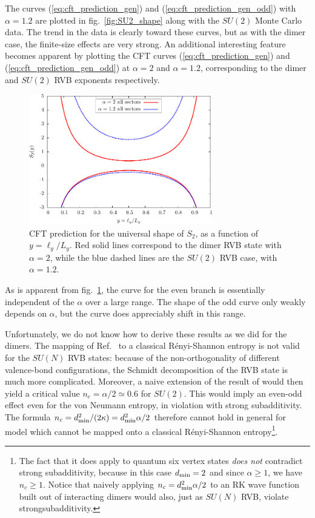 \documentclass[11pt]{iopart}
\begin{document}
The curves (\ref{eq:cft_prediction_gen}) and (\ref{eq:cft_prediction_gen_odd}) 
 with $\alpha=1.2$ are plotted in fig.~\ref{fig:SU2_shape} along with the $SU(2)$ Monte Carlo data.  The trend in the data is clearly toward these curves, but as with the dimer case, the finite-size effects are very strong. 
An additional interesting feature becomes apparent by plotting the CFT curves
(\ref{eq:cft_prediction_gen}) and (\ref{eq:cft_prediction_gen_odd}) at $\alpha=2$ and $\alpha=1.2$, corresponding to the dimer and $SU(2)$ RVB exponents respectively.
\begin{figure}[ht]
 \begin{center}
  \includegraphics[width=8cm]{./figures/SUN_CFT.pdf}
 \end{center}
\caption{CFT prediction for the universal shape of $S_2$, as a function of $y=\ell_y/L_y$. Red solid lines correspond to the dimer RVB state with $\alpha=2$, while the blue dashed lines are the $SU(2)$ RVB case, with $\alpha= 1.2$.}
\label{fig:SUN_CFT}
\end{figure}
As is apparent from fig.~\ref{fig:SUN_CFT}, the curve for the even branch is essentially independent of the $\alpha$ over a large range. The shape of the odd curve only weakly depends on $\alpha$, but the curve does appreciably shift in this range.

Unfortunately, we do not know how to derive these results as we did for the dimers. The mapping of Ref.~\cite{Shannonee} to a classical R\'enyi-Shannon entropy is not valid for the $SU(N)$ RVB states: because of the non-orthogonality of different valence-bond configurations, the Schmidt decomposition of the RVB state is much more complicated.  Moreover, a naive extension of the result of \cite{Stephan2011} would then yield a critical value $ n_c=\alpha/2\simeq 0.6$  for $SU(2)$. This would imply an even-odd effect even for the von Neumann entropy, in violation with strong subadditivity\cite{Strongsubadditivity}. The formula $n_c=d_{\rm min }^2/(2\kappa)=d_{\rm min}^2\alpha/2$ therefore cannot hold in general for model which cannot be mapped onto a classical R\'enyi-Shannon entropy\footnote{The fact that it does apply to quantum six vertex states \emph{does not} contradict strong subadditivity, because in this case $d_{\rm min}=2$ and since $\alpha \geq 1$, we have $n_c\geq 1$. Notice that naively applying $n_
c=d_{\rm min}^2 \alpha/2$ to an RK wave function built out of interacting dimers\cite{Alet_dimers1,Alet_dimers2} would also, just as $SU(N)$ RVB, violate strongsubadditivity.}.
\end{document}
